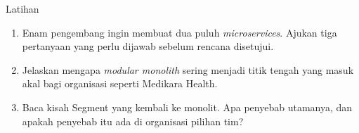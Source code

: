 \documentclass[aspectratio=169, table, 12pt]{beamer}
\begin{document}
\begin{frame}{{\Large Latihan}}
  \vspace{6pt}
  \small
  \begin{enumerate}
    \item Enam pengembang ingin membuat dua puluh \textit{microservices}. Ajukan tiga pertanyaan
          yang perlu dijawab sebelum rencana disetujui.
    \item Jelaskan mengapa \textit{modular monolith} sering menjadi titik tengah yang masuk akal
          bagi organisasi seperti Medikara Health.
    \item Baca kisah Segment yang kembali ke monolit. Apa penyebab utamanya, dan apakah penyebab
          itu ada di organisasi pilihan tim?
  \end{enumerate}
\end{frame}
\end{document}
